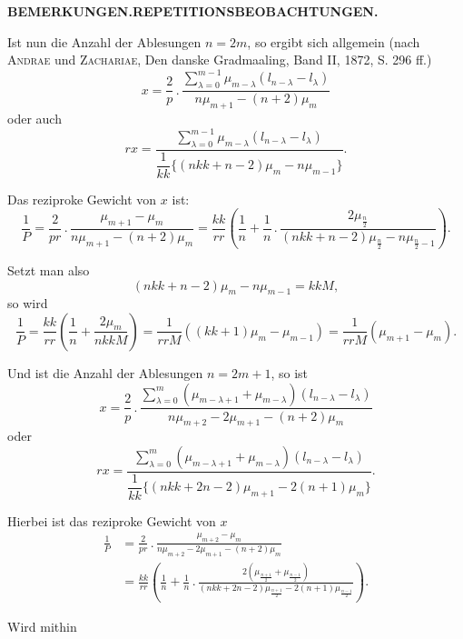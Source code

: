 \par\clearpage
\noindent\null\hfill{\small\textbf{BEMERKUNGEN.\quad REPETITIONSBEOBACHTUNGEN.}}\hfill{}\par\medskip
\begingroup\small
\par\noindent\hspace*{\parindent}Ist nun die Anzahl der Ablesungen $n=2m$, so ergibt sich allgemein (nach \textsc{Andrae} und \textsc{Zachariae}, Den danske Gradmaaling, Band II, 1872, S. 296 ff.)
\[
x=\frac2p\,.\,\frac{\displaystyle\sum_{\lambda=0}^{m-1}\mu_{m-\lambda}(l_{n-\lambda}-l_\lambda)}{n\mu_{m+1}-(n+2)\mu_m}
\]
\noindent oder auch
\[
rx=\frac{\displaystyle\sum_{\lambda=0}^{m-1}\mu_{m-\lambda}(l_{n-\lambda}-l_\lambda)}{\dfrac1{kk}\{(nkk+n-2)\mu_m-n\mu_{m-1}\}}.
\]
\par\noindent\hspace*{\parindent}Das reziproke Gewicht von $x$ ist:
\[
\frac1P=\frac2{pr}\,.\,\frac{\mu_{m+1}-\mu_m}{n\mu_{m+1}-(n+2)\mu_m}
=\frac{kk}{rr}\left(\frac1n+\frac1n\,.\,\frac{2\mu_{\frac n2}}{(nkk+n-2)\mu_{\frac n2}-n\mu_{\frac n2-1}}\right).
\]
\par\noindent\hspace*{\parindent}Setzt man also
\[
(nkk+n-2)\mu_m-n\mu_{m-1}=kkM,
\]
\noindent so wird
\[
\frac1P=\frac{kk}{rr}\left(\frac1n+\frac{2\mu_m}{nkkM}\right)
=\frac1{rrM}((kk+1)\mu_m-\mu_{m-1})=\frac1{rrM}(\mu_{m+1}-\mu_m).
\]
\par\noindent\hspace*{\parindent}Und ist die Anzahl der Ablesungen $n=2m+1$, so ist
\[
x=\frac2p\,.\,\frac{\displaystyle\sum_{\lambda=0}^{m}(\mu_{m-\lambda+1}+\mu_{m-\lambda})(l_{n-\lambda}-l_\lambda)}{n\mu_{m+2}-2\mu_{m+1}-(n+2)\mu_m}
\]
\noindent oder
\[
rx=\frac{\displaystyle\sum_{\lambda=0}^{m}(\mu_{m-\lambda+1}+\mu_{m-\lambda})(l_{n-\lambda}-l_\lambda)}{\dfrac1{kk}\{(nkk+2n-2)\mu_{m+1}-2(n+1)\mu_m\}}.
\]
\par\noindent\hspace*{\parindent}Hierbei ist das reziproke Gewicht von $x$
\[
\begin{aligned}
\frac1P&=\frac2{pr}\,.\,\frac{\mu_{m+2}-\mu_m}{n\mu_{m+2}-2\mu_{m+1}-(n+2)\mu_m}\\
&=\frac{kk}{rr}\left(\frac1n+\frac1n\,.\,\frac{2(\mu_{\frac{n+1}2}+\mu_{\frac{n-1}2})}{(nkk+2n-2)\mu_{\frac{n+1}2}-2(n+1)\mu_{\frac{n-1}2}}\right).
\end{aligned}
\]
\par\noindent\hspace*{\parindent}Wird mithin

